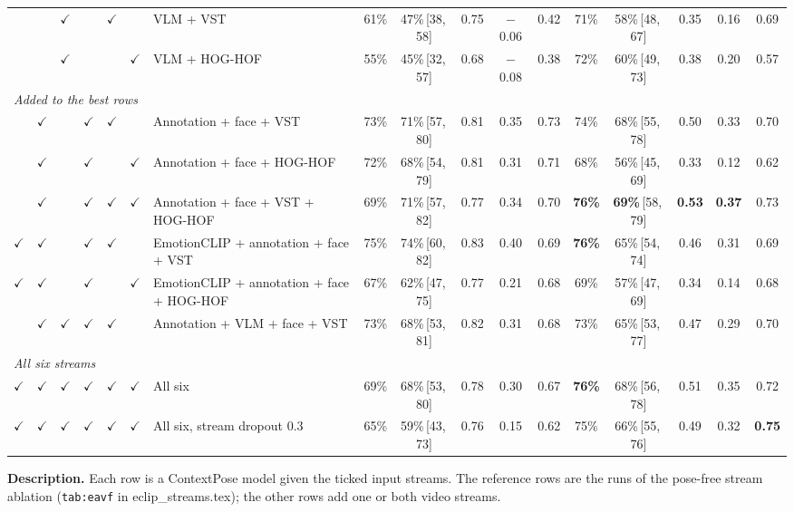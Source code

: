 \documentclass[11pt]{article}
\newcommand{\code}[1]{\texttt{#1}}
\newcommand{\best}[1]{\textbf{#1}}
\newcommand{\ci}[2]{\,[#1,\,#2]}
\newcommand{\tabledesc}[1]{\par\medskip\begin{minipage}{\linewidth}\footnotesize\textbf{Description.} #1\end{minipage}}
\begin{document}
\begin{table}[!htbp]
{\begin{tabular}{cccccclcccccccccc}
 &  & $\checkmark$ &  & $\checkmark$ &  & VLM + VST & 61\% & 47\%\ci{38}{58} & 0.75 & $-$0.06 & 0.42 & 71\% & 58\%\ci{48}{67} & 0.35 & 0.16 & 0.69 \\
 &  & $\checkmark$ &  &  & $\checkmark$ & VLM + HOG-HOF & 55\% & 45\%\ci{32}{57} & 0.68 & $-$0.08 & 0.38 & 72\% & 60\%\ci{49}{73} & 0.38 & 0.20 & 0.57 \\
\midrule
\multicolumn{17}{l}{\emph{Added to the best rows}} \\
 & $\checkmark$ &  & $\checkmark$ & $\checkmark$ &  & Annotation + face + VST & 73\% & 71\%\ci{57}{80} & 0.81 & 0.35 & 0.73 & 74\% & 68\%\ci{55}{78} & 0.50 & 0.33 & 0.70 \\
 & $\checkmark$ &  & $\checkmark$ &  & $\checkmark$ & Annotation + face + HOG-HOF & 72\% & 68\%\ci{54}{79} & 0.81 & 0.31 & 0.71 & 68\% & 56\%\ci{45}{69} & 0.33 & 0.12 & 0.62 \\
 & $\checkmark$ &  & $\checkmark$ & $\checkmark$ & $\checkmark$ & Annotation + face + VST + HOG-HOF & 69\% & 71\%\ci{57}{82} & 0.77 & 0.34 & 0.70 & \best{76\%} & \best{69\%}\ci{58}{79} & \best{0.53} & \best{0.37} & 0.73 \\
$\checkmark$ & $\checkmark$ &  & $\checkmark$ & $\checkmark$ &  & EmotionCLIP + annotation + face + VST & 75\% & 74\%\ci{60}{82} & 0.83 & 0.40 & 0.69 & \best{76\%} & 65\%\ci{54}{74} & 0.46 & 0.31 & 0.69 \\
$\checkmark$ & $\checkmark$ &  & $\checkmark$ &  & $\checkmark$ & EmotionCLIP + annotation + face + HOG-HOF & 67\% & 62\%\ci{47}{75} & 0.77 & 0.21 & 0.68 & 69\% & 57\%\ci{47}{69} & 0.34 & 0.14 & 0.68 \\
 & $\checkmark$ & $\checkmark$ & $\checkmark$ & $\checkmark$ &  & Annotation + VLM + face + VST & 73\% & 68\%\ci{53}{81} & 0.82 & 0.31 & 0.68 & 73\% & 65\%\ci{53}{77} & 0.47 & 0.29 & 0.70 \\
\midrule
\multicolumn{17}{l}{\emph{All six streams}} \\
$\checkmark$ & $\checkmark$ & $\checkmark$ & $\checkmark$ & $\checkmark$ & $\checkmark$ & All six & 69\% & 68\%\ci{53}{80} & 0.78 & 0.30 & 0.67 & \best{76\%} & 68\%\ci{56}{78} & 0.51 & 0.35 & 0.72 \\
$\checkmark$ & $\checkmark$ & $\checkmark$ & $\checkmark$ & $\checkmark$ & $\checkmark$ & All six, stream dropout 0.3 & 65\% & 59\%\ci{43}{73} & 0.76 & 0.15 & 0.62 & 75\% & 66\%\ci{55}{76} & 0.49 & 0.32 & \best{0.75} \\
\bottomrule
\end{tabular}%
}
\tabledesc{Each row is a ContextPose model given the ticked input streams. The reference rows are the runs of the pose-free stream ablation (\code{tab:eavf} in eclip\_streams.tex); the other rows add one or both video streams.
}
\end{table}
\end{document}
